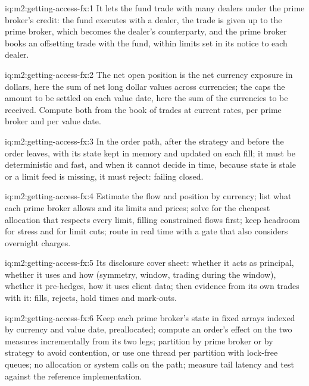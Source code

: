 \begin{solution}{iq:m2:getting-access-fx:1}
It lets the fund trade with many dealers under the prime broker's credit: the fund
executes with a dealer, the trade is given up to the prime broker, which becomes the
dealer's counterparty, and the prime broker books an offsetting trade with the fund,
within limits set in its notice to each dealer.
\end{solution}

\begin{solution}{iq:m2:getting-access-fx:2}
The net open position is the net currency exposure in dollars, here the sum of net long
dollar values across currencies; the  caps the amount to be settled on
each value date, here the sum of the currencies to be received. Compute both from the
book of trades at current rates, per prime broker and per value date.
\end{solution}

\begin{solution}{iq:m2:getting-access-fx:3}
In the order path, after the strategy and before the order leaves, with its state kept
in memory and updated on each fill; it must be deterministic and fast, and when it
cannot decide in time, because state is stale or a limit feed is missing, it must
reject: failing closed.
\end{solution}

\begin{solution}{iq:m2:getting-access-fx:4}
Estimate the flow and position by currency; list what each prime broker allows and its
limits and prices; solve for the cheapest allocation that respects every limit, filling
constrained flows first; keep headroom for stress and for limit cuts; route in real
time with a gate that also considers overnight charges.
\end{solution}

\begin{solution}{iq:m2:getting-access-fx:5}
Its disclosure cover sheet: whether it acts as principal, whether it uses  and
how (symmetry, window, trading during the window), whether it pre-hedges, how it uses
client data; then evidence from its own trades with it: fills, rejects, hold times and
mark-outs.
\end{solution}

\begin{solution}{iq:m2:getting-access-fx:6}
Keep each prime broker's state in fixed arrays indexed by currency and value date,
preallocated; compute an order's effect on the two measures incrementally from its two
legs; partition by prime broker or by strategy to avoid contention, or use one thread
per partition with lock-free queues; no allocation or system calls on the path; measure
tail latency and test against the reference implementation.
\end{solution}
